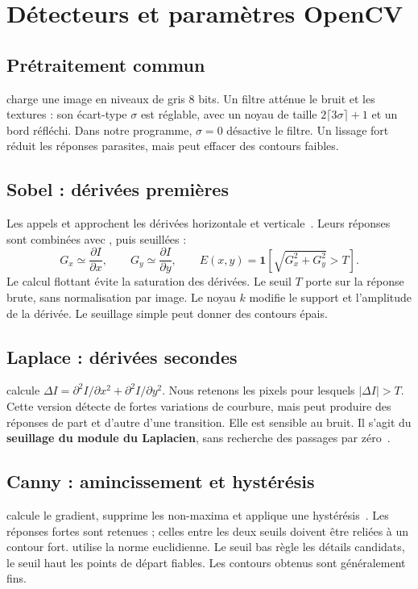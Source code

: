 \section{Détecteurs et paramètres OpenCV}
\subsection{Prétraitement commun}
 charge une image en niveaux de gris 8 bits. Un filtre  atténue le bruit et les textures : son écart-type $\sigma$ est réglable, avec un noyau de taille $2\lceil3\sigma\rceil+1$ et un bord réfléchi. Dans notre programme, $\sigma=0$ désactive le filtre. Un lissage fort réduit les réponses parasites, mais peut effacer des contours faibles.

\subsection{Sobel : dérivées premières}
Les appels  et  approchent les dérivées horizontale et verticale~\cite{sobel}. Leurs réponses sont combinées avec , puis seuillées :
\[
  G_x\simeq\frac{\partial I}{\partial x},\qquad
  G_y\simeq\frac{\partial I}{\partial y},\qquad
  E(x,y)=\mathbf{1}\!\left[\sqrt{G_x^2+G_y^2}>T\right].
\]
Le calcul flottant évite la saturation des dérivées. Le seuil $T$ porte sur la réponse brute, sans normalisation par image. Le noyau $k$ modifie le support et l'amplitude de la dérivée. Le seuillage simple peut donner des contours épais.

\subsection{Laplace : dérivées secondes}
 calcule $\Delta I=\partial^2 I/\partial x^2+\partial^2 I/\partial y^2$. Nous retenons les pixels pour lesquels $|\Delta I|>T$. Cette version détecte de fortes variations de courbure, mais peut produire des réponses de part et d'autre d'une transition. Elle est sensible au bruit. Il s'agit du \textbf{seuillage du module du Laplacien}, sans recherche des passages par zéro~\cite{laplace}.

\subsection{Canny : amincissement et hystérésis}
 calcule le gradient, supprime les non-maxima et applique une hystérésis~\cite{canny}. Les réponses fortes sont retenues ; celles entre les deux seuils doivent être reliées à un contour fort.  utilise la norme euclidienne. Le seuil bas règle les détails candidats, le seuil haut les points de départ fiables. Les contours obtenus sont généralement fins.

